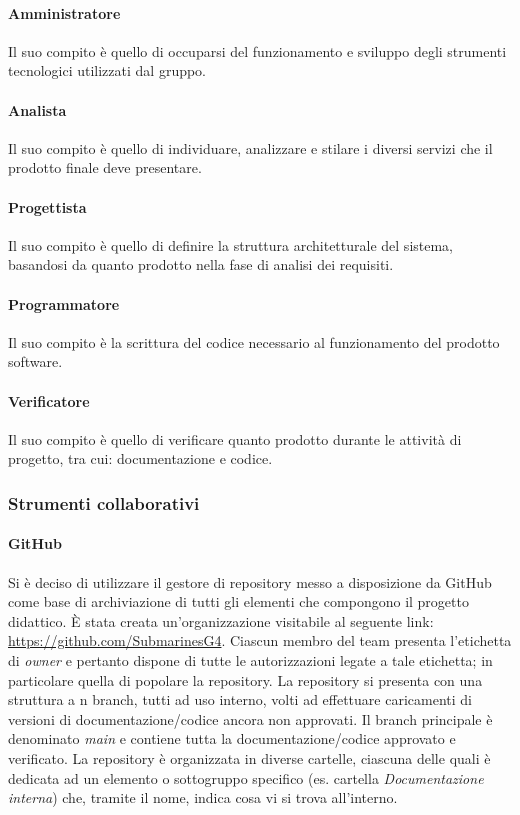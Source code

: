 \paragraph{Amministratore}
Il suo compito è quello di occuparsi del funzionamento e sviluppo degli strumenti tecnologici utilizzati dal gruppo.

\paragraph{Analista}
Il suo compito è quello di individuare, analizzare e stilare i diversi servizi che il prodotto finale deve presentare.

\paragraph{Progettista}
Il suo compito è quello di definire la struttura architetturale del sistema, basandosi da quanto prodotto nella fase di analisi dei requisiti.

\paragraph{Programmatore}
Il suo compito è la scrittura del codice necessario al funzionamento del prodotto software.

\paragraph{Verificatore}
Il suo compito è quello di verificare quanto prodotto durante le attività di progetto, tra cui: documentazione e codice.

\subsubsection{Strumenti collaborativi}
\paragraph{GitHub}
Si è deciso di utilizzare il gestore di repository\glo{} messo a disposizione da GitHub\glo{} come base di
archiviazione di tutti gli elementi che compongono il progetto didattico. È stata creata un’organizzazione visitabile al seguente link: \href{https://github.com/SubmarinesG4}{https://github.com/SubmarinesG4}.
Ciascun membro del team presenta l’etichetta di \textit{owner} e pertanto dispone di tutte le autorizzazioni legate a tale etichetta; in particolare quella di popolare la repository.
La repository si presenta con una struttura a n branch, tutti ad uso interno, volti ad effettuare caricamenti di versioni di documentazione/codice ancora non approvati. Il branch principale è denominato \textit{main} e contiene tutta la documentazione/codice approvato e verificato. 
La repository è organizzata in diverse cartelle, ciascuna delle quali è dedicata ad un elemento o sottogruppo specifico (es. cartella \textit{Documentazione interna}) che, tramite il nome, indica cosa vi si trova all'interno. 

